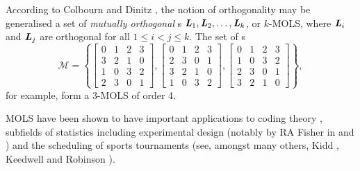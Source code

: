According to Colbourn and Dinitz  \cite[Definition 3.3]{colb}, the notion of orthogonality may  be generalised a set  of \emph{mutually orthogonal} \lat s $\mbox{\bf \emph{L}}_1, \mbox{\bf \emph{L}}_2, \ldots, \mbox{\bf \emph{L}}_k$, or $k$-MOLS, where $\mbox{\bf \emph{L}}_i$ and $\mbox{\bf \emph{L}}_j$ are orthogonal for all $1\leq i < j\leq k$. The set of \lat s 
\[  \mathcal{M} = \left\{ \left[ \begin{matrix}
      0 & 1 & 2 & 3\\
      3 & 2 & 1 & 0\\
      1 & 0 & 3 & 2\\
      2 & 3 & 0 & 1
    \end{matrix}\right] ,
    \left[ \begin{matrix}
      0 & 1 & 2 & 3\\
      2 & 3 & 0 & 1\\
      3 & 2 & 1 & 0\\
      1 & 0 & 3 & 2
    \end{matrix} \right],
      \left[   \begin{matrix}
      0 & 1 & 2 & 3\\
      1 & 0 & 3 & 2\\
      2 & 3 & 0 & 1\\
      3 & 2 & 1 & 0
    \end{matrix}  \right]     \right\}  ,    \] for example, form a 3-MOLS of order 4.

MOLS have been shown to have important applications to coding theory \cite{laywine}, subfields of statistics including experimental design (notably by RA Fisher in  \cite{fisher1} and \cite{fisher2}) and the scheduling of sports tournaments (see, amongst many others, Kidd \cite{kidd2010tabu}, Keedwell \cite{keedwell2000designing} and Robinson \cite{robinson}).
    
